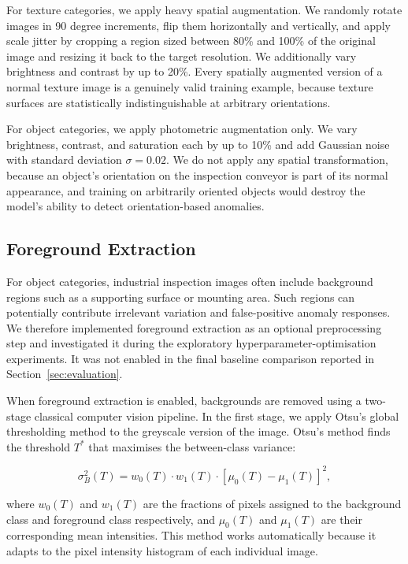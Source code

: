 \documentclass[11pt, a4paper]{article}
\begin{document}
For texture categories, we apply heavy spatial augmentation. We randomly rotate images in 90 degree increments, flip them horizontally and vertically, and apply scale jitter by cropping a region sized between 80\% and 100\% of the original image and resizing it back to the target resolution. We additionally vary brightness and contrast by up to 20\%. Every spatially augmented version of a normal texture image is a genuinely valid training example, because texture surfaces are statistically indistinguishable at arbitrary orientations.

For object categories, we apply photometric augmentation only. We vary brightness, contrast, and saturation each by up to 10\% and add Gaussian noise with standard deviation $\sigma = 0.02$. We do not apply any spatial transformation, because an object's orientation on the inspection conveyor is part of its normal appearance, and training on arbitrarily oriented objects would destroy the model's ability to detect orientation-based anomalies.

\subsection{Foreground Extraction}
\label{sec:foreground}

For object categories, industrial inspection images often include background regions such as a supporting surface or mounting area. Such regions can potentially contribute irrelevant variation and false-positive anomaly responses. We therefore implemented foreground extraction as an optional preprocessing step and investigated it during the exploratory hyperparameter-optimisation experiments. It was not enabled in the final baseline comparison reported in Section~\ref{sec:evaluation}.

When foreground extraction is enabled, backgrounds are removed using a two-stage classical computer vision pipeline. In the first stage, we apply Otsu's global thresholding method \cite{otsu1979} to the greyscale version of the image. Otsu's method finds the threshold $T^*$ that maximises the between-class variance:

\[
\sigma_B^2(T) = w_0(T) \cdot w_1(T) \cdot \left[\mu_0(T) - \mu_1(T)\right]^2,
\]

where $w_0(T)$ and $w_1(T)$ are the fractions of pixels assigned to the background class and foreground class respectively, and $\mu_0(T)$ and $\mu_1(T)$ are their corresponding mean intensities. This method works automatically because it adapts to the pixel intensity histogram of each individual image.
\end{document}
